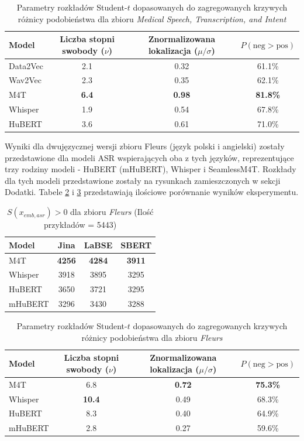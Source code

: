 \begin{table}[t]
\centering
\begin{tabular}{lccc}
\hline
Model & Liczba stopni swobody ($\nu$) & Znormalizowana lokalizacja ($\mu/\sigma$) & $P(\text{neg} > \text{pos})$ \\
\hline
Data2Vec  & 2.1 & 0.32 & 61.1\% \\
Wav2Vec   & 2.3 & 0.35 & 62.1\% \\
M4T    & \textbf{6.4} & \textbf{0.98} & \textbf{81.8\%} \\
Whisper   & 1.9 & 0.54 & 67.8\% \\
HuBERT    & 3.6 & 0.61 & 71.0\% \\
\hline
\end{tabular}
\caption{Parametry rozkładów Student-$t$ dopasowanych do zagregowanych krzywych różnicy podobieństwa dla zbioru \textit{Medical Speech, Transcription, and Intent}}
\label{tab:latent:haniaDist}
\end{table}

Wyniki dla dwujęzycznej wersji zbioru Fleurs (język polski i angielski) zostały przedstawione dla modeli ASR wspierających oba z tych języków, reprezentujące trzy rodziny modeli - HuBERT (mHuBERT), Whisper i SeamlessM4T. Rozkłady dla tych modeli przedstawione zostały na rysunkach zamieszczonych w sekcji Dodatki. Tabele \ref{tab:latent:fleursCounts} i \ref{tab:latent:fleursDist} przedstawiają ilościowe porównanie wyników eksperymentu.

\begin{table}[ht]
\centering
\caption{$S(x_{emb,asr}) > 0$ dla zbioru \textit{Fleurs} (Ilość przykładów = 5443)}
\label{tab:latent:fleursCounts}
\begin{tabular}{lccc}
\toprule
\textbf{Model} & \textbf{Jina} & \textbf{LaBSE} & \textbf{SBERT} \\
\midrule
M4T  & \textbf{4256} & \textbf{4284} & \textbf{3911} \\
Whisper  & 3918 & 3895 & 3295 \\
HuBERT  & 3650 & 3721 & 3295 \\
mHuBERT   & 3296 & 3430 & 3288 \\
\bottomrule
\end{tabular}
\end{table}

\begin{table}[t]
\centering
\begin{tabular}{lccc}
\hline
Model & Liczba stopni swobody ($\nu$) & Znormalizowana lokalizacja ($\mu/\sigma$) & $P(\text{neg} > \text{pos})$ \\
\hline
M4T    & 6.8 & \textbf{0.72} & \textbf{75.3\%} \\
Whisper   & \textbf{10.4} & 0.49 & 68.3\% \\
HuBERT   & 8.3 & 0.40 & 64.9\% \\
mHuBERT    & 2.8 & 0.27 & 59.6\% \\
\hline
\end{tabular}
\caption{Parametry rozkładów Student-$t$ dopasowanych do zagregowanych krzywych różnicy podobieństwa dla zbioru \textit{Fleurs}}
\label{tab:latent:fleursDist}
\end{table}

